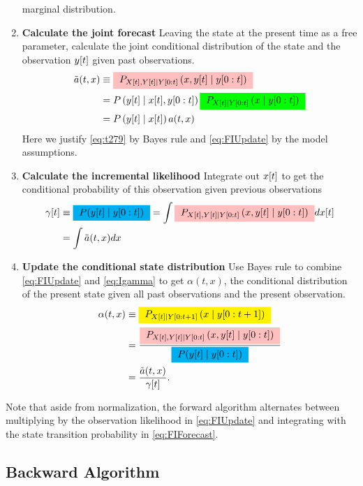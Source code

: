 \begin{enumerate}
marginal distribution.
\item \textbf{Calculate the joint forecast} Leaving the state at the
  present time as a free parameter, calculate the joint conditional
  distribution of the state and the observation ${y}{[t]}$ given past
  observations.
  \begin{align}
    \nonumber
  \tilde a(t,x) & \equiv \JointForecast{X}{x}{t} \\
  \label{eq:t279}
                &= P\left(\ti{y}{t}\given \ti{x}{t},\ts{y}{0}{t} \right)
  \StateForecast{X}{x}{t} \\
  \label{eq:FIUpdate}
  &=P\left(\ti{y}{t}\given \ti{x}{t} \right) a(t,x)
\end{align}
Here we justify \eqref{eq:t279} by Bayes rule and \eqref{eq:FIUpdate} by
the model assumptions.
\item \textbf{Calculate the incremental likelihood}
  Integrate out ${x}{[t]}$ to get the conditional probability of
  this observation given previous observations
  \begin{align}
    \nonumber
    \ti{\gamma}{t} &\equiv \gammax = \int
  \JointForecast{X}{x}{t} d\ti{x}{t} \\
    \label{eq:Igamma}
    &= \int \tilde a(t,x) dx
\end{align}
\item \textbf{Update the conditional state distribution}
   Use Bayes rule to combine \eqref{eq:FIUpdate} and
  \eqref{eq:Igamma} to get $\alpha(t,x)$, the conditional distribution
  of the present state given all past observations and the present
  observation.
\begin{align}
  \alpha(t,x) &\equiv \alphax{X}{t}{t+1}{x} \\
  &=  \frac{ \JointForecast{X}{x}{t}}{\gammax}\\
  \label{eq:IUpdate}
  &= \frac{\tilde a(t,x)}{\ti{\gamma}{t}}.
\end{align}
\end{enumerate}
Note that aside from normalization, the forward algorithm alternates
between multiplying by the observation likelihood in
\eqref{eq:FIUpdate} and integrating with the state transition
probability in \eqref{eq:FIForecast}.

\subsection{Backward Algorithm}

